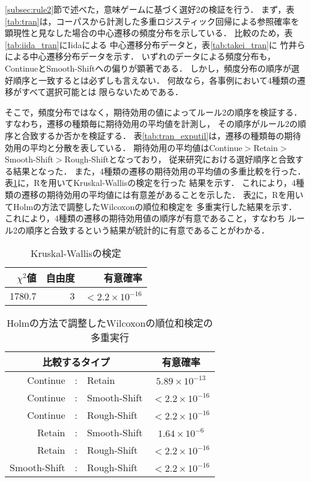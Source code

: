 \ref{subsec:rule2}節で述べた，意味ゲームに基づく選好2の検証を行う．
まず，表\ref{tab:tran}は，コーパスから計測した多重ロジスティック回帰による参照確率を
顕現性と見なした場合の中心遷移の頻度分布を示している．
比較のため，表\ref{tab:iida_tran}にIida\citeyear{iida1996}による
中心遷移分布データと，表\ref{tab:takei_tran}に
竹井ら\citeyear{takei2000}による中心遷移分布データを示す．
いずれのデータによる頻度分布も，ContinueとSmooth-Shiftへの偏りが顕著である．
しかし，頻度分布の順序が選好順序と一致するとは必ずしも言えない．
何故なら，各事例において4種類の遷移がすべて選択可能とは
限らないためである\cite{kibble2001}．

そこで，頻度分布ではなく，期待効用の値によってルール2の順序を検証する．
すなわち，遷移の種類毎に期待効用の平均値を計測し，
その順序がルール2の順序と合致するか否かを検証する．
表\ref{tab:tran_exputil}は，遷移の種類毎の期待効用の平均と分散を表している．
期待効用の平均値はContinue$>$Retain$>$Smooth-Shift$>$Rough-Shiftとなっており，
従来研究における選好順序と合致する結果となった．
また，4種類の遷移の期待効用の平均値の多重比較を行った．
表\ref{tab:kruskal}に，R\cite{R}を用いてKruskal-Wallisの検定を行った
結果を示す．
これにより，4種類の遷移の期待効用の平均値には有意差があることを示した．
表\ref{tab:wilcoxon}に，Rを用いてHolmの方法で調整したWilcoxonの順位和検定を
多重実行した結果を示す．
これにより，4種類の遷移の期待効用値の順序が有意であること，すなわち
ルール2の順序と合致するという結果が統計的に有意であることがわかる．

\begin{table}
\begin{center}
\begin{tabular}{|r|r|r|}
\hline
$\chi^2$値&自由度&有意確率\\
\hline\hline
1780.7&3&$<2.2\times10^{-16}$\\
\hline
\end{tabular}
\end{center}
\caption{Kruskal-Wallisの検定}
\label{tab:kruskal}
\end{table}

\begin{table}
\begin{center}
\begin{tabular}{|rcl|c|}
\hline
\multicolumn{3}{|c|}{比較するタイプ}&有意確率\\
\hline\hline
Continue&:&Retain&$5.89\times10^{-13}$\\
Continue&:&Smooth-Shift&$<2.2\times10^{-16}$\\
Continue&:&Rough-Shift&$<2.2\times10^{-16}$\\
Retain&:&Smooth-Shift&$1.64\times10^{-6}$\\
Retain&:&Rough-Shift&$<2.2\times10^{-16}$\\
Smooth-Shift&:&Rough-Shift&$<2.2\times10^{-16}$\\
\hline
\end{tabular}
\end{center}
\caption{Holmの方法で調整したWilcoxonの順位和検定の多重実行}
\label{tab:wilcoxon}
\end{table}










